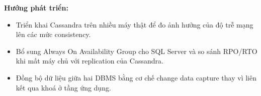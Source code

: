 \textbf{Hướng phát triển:}
\begin{itemize}
    \item Triển khai Cassandra trên nhiều máy thật để đo ảnh hưởng của độ trễ mạng lên các mức consistency.
    \item Bổ sung Always On Availability Group cho SQL Server và so sánh RPO/RTO khi mất máy chủ với replication của Cassandra.
    \item Đồng bộ dữ liệu giữa hai DBMS bằng cơ chế change data capture thay vì liên kết qua khoá ở tầng ứng dụng.
\end{itemize}

